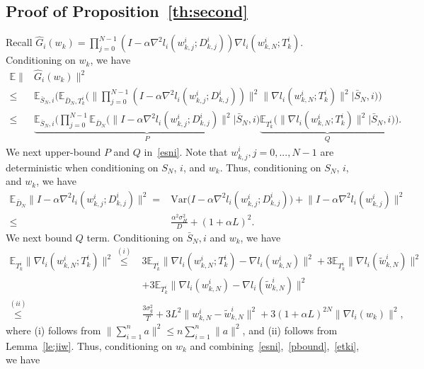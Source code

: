 \documentclass{osudissert96}
\begin{document}
\subsection*{Proof of Proposition~\ref{th:second}}
Recall {\footnotesize$\widehat G_i(w_k)=  \prod_{j=0}^{N-1}(I - \alpha \nabla^2 l_i(w_{k,j}^i;  D_{k,j}^i))\nabla l_i(w_{k,N}^i;  T^i_k)$}.  
Conditioning on $w_k$, we have 
	\begin{align}\label{esni}
	\mathbb{E}\|&\widehat G_i(w_k)\|^2 \nonumber
	\\\leq &\mathbb{E}_{\bar S_N, i } \bigg( \mathbb{E}_{\bar D_N, T_k^i} \Big(  \Big \|\prod_{j=0}^{N-1}(I - \alpha \nabla^2 l_i(w_{k,j}^i; D_{k,j}^i))\Big\|^2 \|\nabla l_i(w_{k,N}^i; T^i_k)\|^2 \Big | \bar S_N, i         \Big)\bigg) \nonumber
	\\\leq & \underbrace{\mathbb{E}_{\bar S_N, i } \bigg( \prod_{j=0}^{N-1} \mathbb{E}_{\bar D_N} \Big(  \Big \|I - \alpha \nabla^2 l_i(w_{k,j}^i; D_{k,j}^i)\Big\|^2 \Big | \bar S_N, i \Big)}_{P} \underbrace{\mathbb{E}_{T_k^i}\Big( \|\nabla l_i(w_{k,N}^i; T^i_k)\|^2 \Big |\bar  S_N, i         \Big)}_{Q}\bigg). 
	\end{align}
	We  next upper-bound $P$ and $Q$ in~\cref{esni}. Note that $w_{k,j}^i, j=0,...,N-1$ are deterministic when conditioning on $S_N$, $i$, and $w_k$. Thus, conditioning on $S_N$, $i$, and $w_k$, we have 
	\begin{align}\label{pbound}
	\mathbb{E}_{\bar D_N}  \Big \|I - \alpha \nabla^2 l_i(w_{k,j}^i; D_{k,j}^i)\Big\|^2  = & \text{Var} \Big(  I - \alpha \nabla^2 l_i(w_{k,j}^i; D_{k,j}^i)  \Big) +\big\|I - \alpha \nabla^2 l_i(w_{k,j}^i) \big\|^2 \nonumber
	\\\leq & \frac{\alpha^2\sigma_H^2}{D} + (1+\alpha L)^2.
	\end{align}
	We next bound $Q$ term. Conditioning on $\bar S_N, i$ and $w_k$, we have 
	\begin{align}\label{etki}
	\mathbb{E}_{T_k^i} \|\nabla l_i(w_{k,N}^i; T^i_k)\|^2 \overset{(i)}\leq & 3\mathbb{E}_{T_k^i}\|\nabla l_i(w_{k,N}^i;  T^i_k) -\nabla l_i(w_{k,N}^i)\|^2 + 3\mathbb{E}_{T_k^i}\|\nabla l_i(\widetilde w_{k,N}^i) \|^2 \nonumber
	\\ &+ 3\mathbb{E}_{T_k^i}\|\nabla l_i(w_{k,N}^i) - \nabla l_i(\widetilde w_{k,N}^i)\|^2\nonumber
	\\\overset{(ii)}\leq & \frac{3\sigma_g^2}{T} + 3L^2 \|w_{k,N}^i - \widetilde w_{k,N}^i\|^2 + 3(1+\alpha L)^{2N} \|\nabla l_i(w_k)\|^2,
	\end{align}
	where (i) follows from $\|\sum_{i=1}^n a\|^2\leq n\sum_{i=1}^n\|a\|^2$, and (ii) follows from Lemma~\ref{le:jiw}. Thus, conditioning on $w_k$ and combining~\cref{esni},~\cref{pbound},~\cref{etki}, we have  
\end{document}
